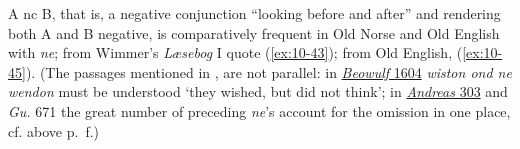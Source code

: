 A nc B, that is, a negative conjunction ``looking before and after'' and rendering both A and B negative, is comparatively frequent in Old Norse and Old English with \textit{ne}; from Wimmer's \textit{Læsebog} I quote (\ref{ex:10-43}); from Old English, (\ref{ex:10-45}). (The passages mentioned in \citet[\href{https://archive.org/details/sprachschatzdera00greiuoft/page/492/mode/2up?view=theater}{~493}]{grein_sprachschatz_1912}, are not parallel: in \href{http://ebeowulf.uky.edu/ebeo4.0/CD/main.html}{\textit{Beowulf} 1604} %
\textit{wiston ond ne wendon} must be understood `they wished, but did not think'; in \href{https://archive.org/details/cu31924013340348/page/n99/mode/2up?view=theater}{\textit{Andreas} 303} %
and \textit{Gu.} 671 %
the great number of preceding \textit{ne}'s account for the omission in one place, cf. above p.~\pageref{sec:type2}f.)

